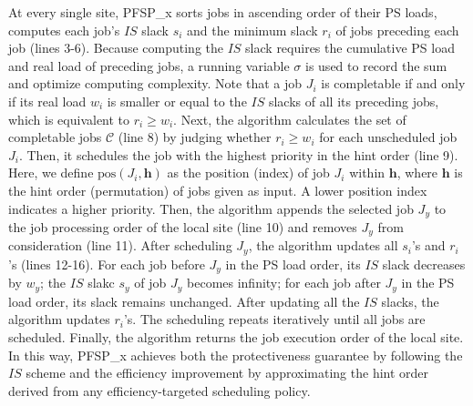 At every single site, PFSP\_x sorts jobs in ascending order of their PS loads, computes each job's $IS$ slack $s_i$ and the minimum slack $r_i$ of jobs preceding each job (lines 3-6). Because computing the $IS$ slack requires the cumulative PS load and real load of preceding jobs, a running variable $\sigma$ is used to record the sum and optimize computing complexity. Note that a job $J_i$ is completable if and only if its real load $w_i$ is smaller or equal to the $IS$ slacks of all its preceding jobs, which is equivalent to $r_i \ge w_i$. Next, the algorithm calculates the set of completable jobs $\mathcal{C}$ (line 8) by judging whether $r_i \ge w_i$ for each unscheduled job $J_i$. Then, it schedules the job with the highest priority in the hint order (line 9). Here, we define $\text{pos}(J_i, \mathbf{h})$ as the position (index) of job $J_i$ within $\mathbf{h}$, where $\mathbf{h}$ is the hint order (permutation) of jobs given as input. A lower position index indicates a higher priority. Then, the algorithm appends the selected job $J_y$ to the job processing order of the local site (line 10) and removes $J_y$ from consideration (line 11). After scheduling $J_y$, the algorithm updates all $s_i$'s and $r_i$'s (lines 12-16). For each job before $J_y$ in the PS load order, its $IS$ slack decreases by $w_y$; the $IS$ slakc $s_y$ of job $J_y$ becomes infinity; for each job after $J_y$ in the PS load order, its slack remains unchanged. After updating all the $IS$ slacks, the algorithm updates $r_i$'s. The scheduling repeats iteratively until all jobs are scheduled. Finally, the algorithm returns the job execution order of the local site. In this way, PFSP\_x achieves both the protectiveness guarantee by following the $IS$ scheme and the efficiency improvement by approximating the hint order derived from any efficiency-targeted scheduling policy.


